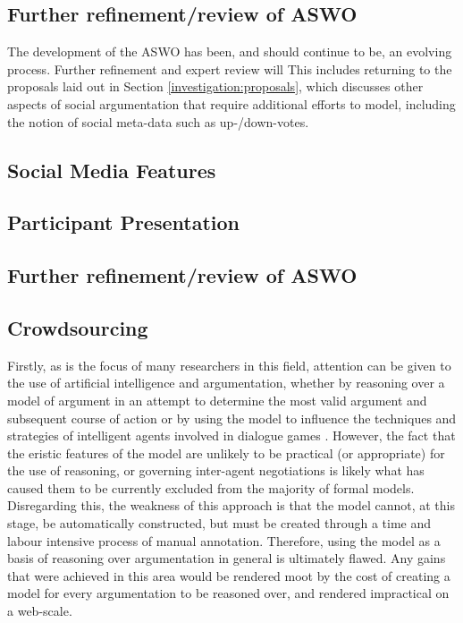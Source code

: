 \subsection{Further refinement/review of ASWO}
The development of the ASWO has been, and should continue to be, an evolving process. Further refinement and expert review will
This includes returning to the proposals laid out in Section \ref{investigation:proposals}, which discusses other aspects of social argumentation that require additional efforts to model, including the notion of social meta-data such as up-/down-votes.

\subsection{Social Media Features}

\subsection{Participant Presentation}

\subsection{Further refinement/review of ASWO}

\subsection{Crowdsourcing}




Firstly, as is the focus of many researchers in this field, attention can be given to the use of artificial intelligence and argumentation, whether by reasoning over a model of argument in an attempt to determine the most valid argument and subsequent course of action \citep{caminada2007} or by using the model to influence the techniques and strategies of intelligent agents involved in dialogue games \citep{Reed2008}. However, the fact that the eristic features of the model are unlikely to be practical (or appropriate) for the use of reasoning, or governing inter-agent negotiations is likely what has caused them to be currently excluded from the majority of formal models. Disregarding this, the weakness of this approach is that the model cannot, at this stage, be automatically constructed, but must be created through a time and labour intensive process of manual annotation. Therefore, using the model as a basis of reasoning over argumentation in general is ultimately flawed. Any gains that were achieved in this area would be rendered moot by the cost of creating a model for every argumentation to be reasoned over, and rendered impractical on a web-scale.

